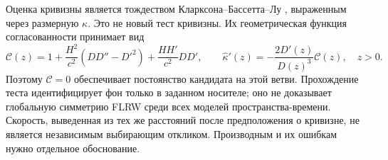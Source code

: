 {Оценка кривизны является тождеством Кларксона--Бассетта--Лу \cite{CBL}, выраженным через размерную $\kappa$. Это не новый тест кривизны. Их геометрическая функция согласованности принимает вид}
\begin{equation}\label{eq:cbl}
 \mathcal C(z)=1+\frac{H^2}{c^2}(DD''-D'^2)+\frac{HH'}{c^2}DD',\qquad
 \widehat\kappa'(z)=-\frac{2D'(z)}{D(z)^3}\mathcal C(z),\quad z>0.
\end{equation}
{Поэтому $\mathcal C=0$ обеспечивает постоянство кандидата на этой ветви. Прохождение теста идентифицирует фон только в заданном носителе; оно не доказывает глобальную симметрию FLRW среди всех моделей пространства-времени. Скорость, выведенная из тех же расстояний после предположения о кривизне, не является независимым выбирающим откликом. Производным и их ошибкам нужно отдельное обоснование.}

